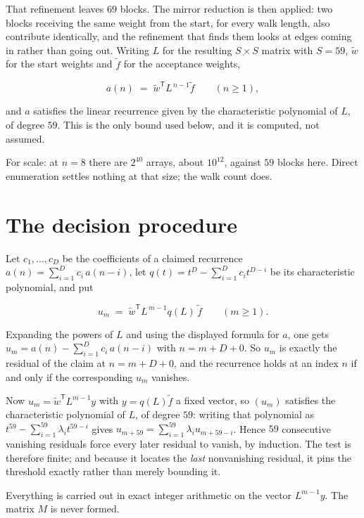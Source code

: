 \documentclass[11pt]{article}
\theoremstyle{definition}
\begin{document}
That refinement leaves $69$ blocks. The mirror reduction is then applied: two blocks receiving the same weight from the start, for every walk length, also contribute identically, and the refinement that finds them looks at edges coming in rather than going out. Writing $L$ for the resulting $S \times S$ matrix with $S = 59$, $\tilde w$ for the start weights and $\tilde f$ for the acceptance weights,

\[a(n) \;=\; \tilde w^{\mathsf T} L^{\,n-1} \tilde f \qquad (n \ge 1),\]

and $a$ satisfies the linear recurrence given by the characteristic polynomial of $L$, of degree $59$. This is the only bound used below, and it is computed, not assumed.

For scale: at $n = 8$ there are $2^{40}$ arrays, about $10^{12}$, against $59$ blocks here. Direct enumeration settles nothing at that size; the walk count does.

\section{The decision procedure}

Let $c_1,\dots,c_D$ be the coefficients of a claimed recurrence $a(n) = \sum_{i=1}^{D} c_i\,a(n-i)$, let $q(t) = t^{D} - \sum_{i=1}^{D} c_i t^{D-i}$ be its characteristic polynomial, and put

\[u_m \;=\; \tilde w^{\mathsf T} L^{\,m-1} q(L)\,\tilde f \qquad (m \ge 1).\]

Expanding the powers of $L$ and using the displayed formula for $a$, one gets $u_m = a(n) - \sum_{i=1}^{D} c_i\,a(n-i)$ with $n = m + D + 0$. So $u_m$ is exactly the residual of the claim at $n = m + D + 0$, and the recurrence holds at an index $n$ if and only if the corresponding $u_m$ vanishes.

Now $u_m = \tilde w^{\mathsf T} L^{m-1} y$ with $y = q(L)\tilde f$ a fixed vector, so $(u_m)$ satisfies the characteristic polynomial of $L$, of degree $59$: writing that polynomial as $t^{59} - \sum_{i=1}^{59} \lambda_i t^{59-i}$ gives $u_{m+59} = \sum_{i=1}^{59} \lambda_i u_{m+59-i}$. Hence $59$ consecutive vanishing residuals force every later residual to vanish, by induction. The test is therefore finite; and because it locates the {\itshape last} nonvanishing residual, it pins the threshold exactly rather than merely bounding it.

Everything is carried out in exact integer arithmetic on the vector $L^{m-1}y$. The matrix $M$ is never formed.
\end{document}
